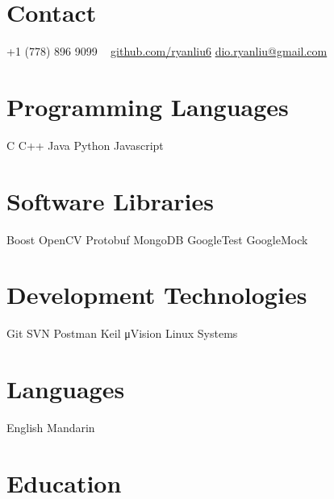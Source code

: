 \documentclass[]{cv-style}          %
\begin{document}
\lastupdated


\begin{aside}
%
\section{Contact}
+1 (778) 896 9099
~
\href{https://github.com/ryanliu6}{github.com/ryanliu6}
\href{mailto:dio.ryanliu@gmail.com}{dio.ryanliu@gmail.com}
\section{Programming Languages}
C
C++
Java
Python
Javascript
\section{Software Libraries}
Boost
OpenCV
Protobuf
MongoDB
GoogleTest
GoogleMock
\section{Development Technologies}
Git
SVN
Postman
Keil μVision
Linux Systems
\section{Languages}
English
Mandarin
%
\end{aside}





\section{Education}
\end{document}
